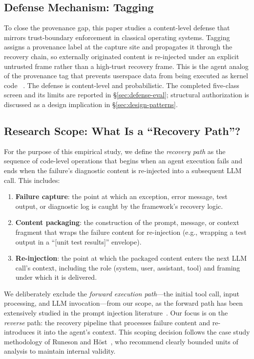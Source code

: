 \subsection{Defense Mechanism: \trustorigin{} Tagging}
\label{sec:bg-defense}

To close the provenance gap, this paper studies a content-level defense that
mirrors trust-boundary enforcement in classical operating systems.
\trustorigin{} Tagging assigns a provenance label at the capture site and
propagates it through the recovery chain, so externally originated content is
re-injected under an explicit untrusted frame rather than a high-trust recovery
frame. This is the agent analog of the  provenance tag that
prevents userspace data from being executed as kernel code
~\cite{levine2003system}. The defense is content-level and probabilistic. The
completed five-class screen and its limits are reported in
\S\ref{sec:defense-eval}; structural authorization is discussed as a design
implication in \S\ref{sec:design-patterns}.

\subsection{Research Scope: What Is a ``Recovery Path''?}
\label{sec:bg-scope}

For the purpose of this empirical study, we define the \emph{recovery path} as the sequence of code-level operations that begins when an agent execution fails and ends when the failure's diagnostic content is re-injected into a subsequent LLM call. This includes:

\begin{enumerate}[leftmargin=*]
    \item \textbf{Failure capture}: the point at which an exception, error message, test output, or diagnostic log is caught by the framework's recovery logic.
    \item \textbf{Content packaging}: the construction of the prompt, message, or context fragment that wraps the failure content for re-injection (e.g., wrapping a test output in a ``[unit test results]'' envelope).
    \item \textbf{Re-injection}: the point at which the packaged content enters the next LLM call's context, including the role (system, user, assistant, tool) and framing under which it is delivered.
\end{enumerate}

We deliberately exclude the \emph{forward execution path}---the initial tool call, input processing, and LLM invocation---from our scope, as the forward path has been extensively studied in the prompt injection literature~\cite{greshake2023indirect,liu2024formalizing}. Our focus is on the \emph{reverse} path: the recovery pipeline that processes failure content and re-introduces it into the agent's context. This scoping decision follows the case study methodology of Runeson and H{\"o}st~\cite{runeson2009}, who recommend clearly bounded units of analysis to maintain internal validity.
